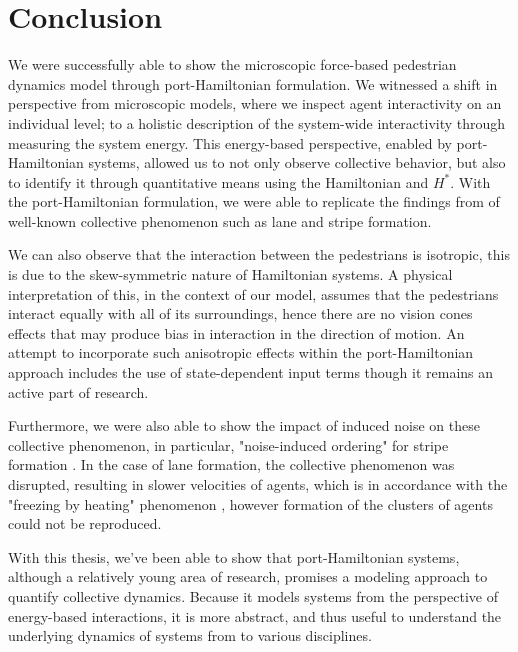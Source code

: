 \section{Conclusion}

We were successfully able to show the microscopic force-based pedestrian dynamics model through port-Hamiltonian formulation. We witnessed a shift in perspective from microscopic models, where we inspect agent interactivity on an individual level; to a holistic description of the system-wide interactivity through measuring the system energy. This energy-based perspective, enabled by port-Hamiltonian systems, allowed us to not only observe collective behavior, but also to identify it through quantitative means using the Hamiltonian and $H^*$. With the port-Hamiltonian formulation, we were able to replicate the findings from \cite{tordeux2022multi} of well-known collective phenomenon such as lane and stripe formation. 

We can also observe that the interaction between the pedestrians is isotropic, this is due to the skew-symmetric nature of Hamiltonian systems. A physical interpretation of this, in the context of our model, assumes that the pedestrians interact equally with all of its surroundings, hence there are no vision cones effects \cite{helbing1995social} that may produce bias in interaction in the direction of motion. An attempt to incorporate such anisotropic effects within the port-Hamiltonian approach includes the use of state-dependent input terms \cite{tordeux2022multi} though it remains an active part of research.

Furthermore, we were also able to show the impact of induced noise on these collective phenomenon, in particular, "noise-induced ordering" for stripe formation \cite{khelfa2021initiating,d2021canard}. In the case of lane formation, the collective phenomenon was disrupted, resulting in slower velocities of agents, which is in accordance with the "freezing by heating" phenomenon \cite{helbing2000freezing}, however formation of the clusters of agents could not be reproduced.

With this thesis, we've been able to show that port-Hamiltonian systems, although a relatively young area of research, promises a modeling approach to quantify collective dynamics. Because it models systems from the perspective of energy-based interactions, it is more abstract, and thus useful to understand the underlying dynamics of systems from to various disciplines.